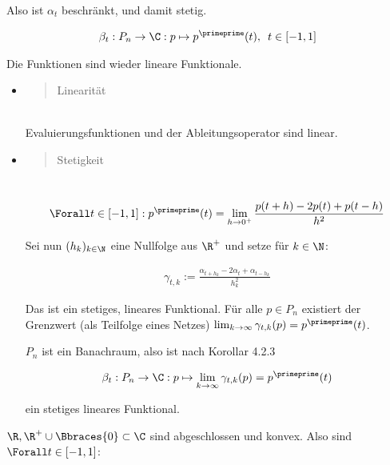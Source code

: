 \begin{solution}
\begin{itemize}
  Also ist $\alpha_t$ beschränkt, und damit stetig.

\end{itemize}

\begin{align*}
  \beta_t :
  P_n \to \C:
  p \mapsto p^\primeprime(t),
  \enspace
  t \in [-1, 1]
\end{align*}

Die Funktionen sind wieder lineare Funktionale.

\begin{itemize}

  \item
  \blockquote{Linearität}: \\

  Evaluierungsfunktionen und der Ableitungsoperator sind linear.

  \item
  \blockquote{Stetigkeit}: \\

  \begin{align*}
    \Forall t \in [-1, 1]:
    p^\primeprime(t)
    =
    \lim_{h \to 0^+} \frac{p(t+h) - 2 p(t) + p(t-h)}{h^2}
  \end{align*}

  Sei nun $(h_k)_{k \in \N}$ eine Nullfolge aus $\R^+$ und setze für $k \in \N$:

  \begin{align*}
    \gamma_{t, k}
    :=
    \frac
    {
      \alpha_{t + h_k} -
      2 \alpha_t +
      \alpha_{t - h_k}
    }
    {h_k^2}
  \end{align*}

  Das ist ein stetiges, lineares Funktional.
  Für alle $p \in P_n$ existiert der Grenzwert (als Teilfolge eines Netzes) $\lim_{k \to \infty} \gamma_{t, k}(p) = p^\primeprime(t)$.


  $P_n$ ist ein Banachraum, also ist nach Korollar 4.2.3

  \begin{align*}
    \beta_t:
    P_n \to \C:
    p \mapsto \lim_{k \to \infty} \gamma_{t, k}(p) = p^\primeprime(t)
  \end{align*}

  ein stetiges lineares Funktional.

\end{itemize}

$\R, \R^+ \cup \Bbraces{0} \subset \C$ sind abgeschlossen und konvex.
Also sind $\Forall t \in [-1, 1]$:


\end{solution}
